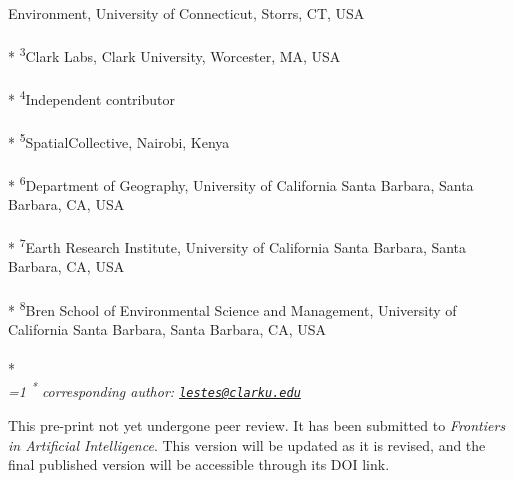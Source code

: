 \documentclass[11pt,a4paper]{article}
\begin{document}
\begin{singlespace}
\begin{justify}
Environment, University of Connecticut, Storrs, CT, USA\\\\*
\footnotesize\textsuperscript{3}Clark Labs, Clark University, Worcester,
MA, USA\\\\*
\footnotesize\textsuperscript{4}Independent contributor\\\\*
\footnotesize\textsuperscript{5}SpatialCollective, Nairobi, Kenya\\\\*
\footnotesize\textsuperscript{6}Department of Geography, University of
California Santa Barbara, Santa Barbara, CA, USA\\\\*
\footnotesize\textsuperscript{7}Earth Research Institute, University of
California Santa Barbara, Santa Barbara, CA, USA\\\\*
\footnotesize\textsuperscript{8}Bren School of Environmental Science and
Management, University of California Santa Barbara, Santa Barbara, CA,
USA\\\\*
\setcounter{num}{1}
\\[0.1cm]
\footnotesize \emph{
\ifnum\value{num}=1%
\textsuperscript{*} corresponding author:
\fi
\href{mailto:lestes@clarku.edu}{\nolinkurl{lestes@clarku.edu}}
}

This pre-print not yet undergone peer review. It has been submitted to
\emph{Frontiers in Artificial Intelligence}. This version will be
updated as it is revised, and the final published version will be
accessible through its DOI link.


\end{justify}
\normalsize


\end{singlespace}
\end{document}
